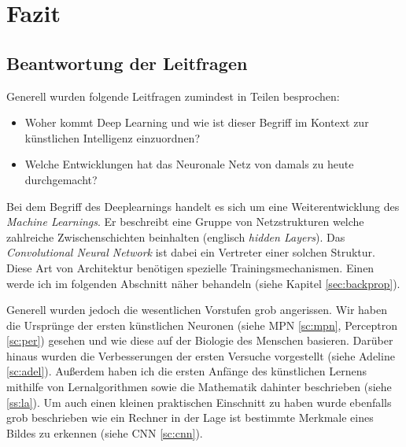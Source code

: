 \section{Fazit}


\subsection{Beantwortung der Leitfragen}

Generell wurden folgende Leitfragen zumindest in Teilen besprochen: 

\begin{itemize}
\item Woher kommt Deep Learning und wie ist dieser Begriff im Kontext zur künstlichen Intelligenz einzuordnen?
\item Welche Entwicklungen hat das Neuronale Netz von damals zu heute durchgemacht?
\end{itemize}

Bei dem Begriff des Deeplearnings handelt es sich um eine Weiterentwicklung des \emph{Machine Learnings}. Er beschreibt eine Gruppe von Netzstrukturen welche zahlreiche Zwischenschichten beinhalten (englisch \emph{hidden Layers}). Das \emph{Convolutional Neural Network} ist dabei ein Vertreter einer solchen Struktur. Diese Art von Architektur benötigen spezielle Trainingsmechanismen. Einen werde ich im folgenden Abschnitt näher behandeln (siehe Kapitel \ref{sec:backprop}). 

Generell wurden jedoch die wesentlichen Vorstufen grob angerissen. Wir haben die Ursprünge der ersten künstlichen Neuronen (siehe MPN \ref{sc:mpn}, Perceptron \ref{sc:per}) gesehen und wie diese auf der Biologie des Menschen basieren. Darüber hinaus wurden die Verbesserungen der ersten Versuche vorgestellt (siehe Adeline \ref{sc:adel}). Außerdem haben ich die ersten Anfänge des künstlichen Lernens mithilfe von Lernalgorithmen sowie die Mathematik dahinter beschrieben (siehe \ref{ss:la}). Um auch einen kleinen praktischen Einschnitt zu haben wurde ebenfalls grob beschrieben wie ein Rechner in der Lage ist bestimmte Merkmale eines Bildes zu erkennen (siehe CNN \ref{sc:cnn}). 
